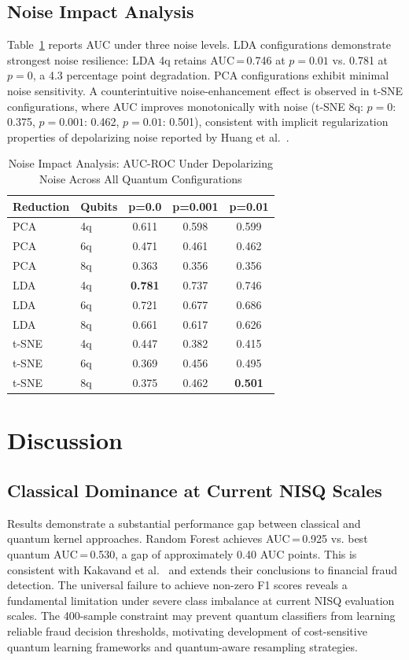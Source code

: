 \documentclass[journal]{IEEEtran}
\begin{document}
\subsection{Noise Impact Analysis}
Table~\ref{tab:noise_results} reports AUC under three noise 
levels. LDA configurations demonstrate strongest noise 
resilience: LDA 4q retains AUC\,=\,0.746 at $p=0.01$ vs. 
0.781 at $p=0$, a 4.3 percentage point degradation. 
PCA configurations exhibit minimal noise sensitivity. 
A counterintuitive noise-enhancement effect is observed in 
t-SNE configurations, where AUC improves monotonically with 
noise (t-SNE 8q: $p=0$: 0.375, $p=0.001$: 0.462, $p=0.01$: 
0.501), consistent with implicit regularization properties 
of depolarizing noise reported by Huang et al.~\cite{huang2026}.

\begin{table}[h]
\caption{Noise Impact Analysis: AUC-ROC Under Depolarizing 
Noise Across All Quantum Configurations}
\label{tab:noise_results}
\centering
\begin{tabular}{llccc}
\toprule
\textbf{Reduction} & \textbf{Qubits} & \textbf{p=0.0} & 
\textbf{p=0.001} & \textbf{p=0.01} \\
\midrule
PCA   & 4q & 0.611 & 0.598 & 0.599 \\
PCA   & 6q & 0.471 & 0.461 & 0.462 \\
PCA   & 8q & 0.363 & 0.356 & 0.356 \\
LDA   & 4q & \textbf{0.781} & 0.737 & 0.746 \\
LDA   & 6q & 0.721 & 0.677 & 0.686 \\
LDA   & 8q & 0.661 & 0.617 & 0.626 \\
t-SNE & 4q & 0.447 & 0.382 & 0.415 \\
t-SNE & 6q & 0.369 & 0.456 & 0.495 \\
t-SNE & 8q & 0.375 & 0.462 & \textbf{0.501} \\
\bottomrule
\end{tabular}
\end{table}

\section{Discussion}
\label{sec:discussion}

\subsection{Classical Dominance at Current NISQ Scales}
Results demonstrate a substantial performance gap between 
classical and quantum kernel approaches. Random Forest 
achieves AUC\,=\,0.925 vs. best quantum AUC\,=\,0.530, 
a gap of approximately 0.40 AUC points. This is consistent 
with Kakavand et al.~\cite{kakavand2026} and extends their 
conclusions to financial fraud detection. The universal 
failure to achieve non-zero F1 scores reveals a fundamental 
limitation under severe class imbalance at current NISQ 
evaluation scales. The 400-sample constraint may prevent 
quantum classifiers from learning reliable fraud decision 
thresholds, motivating development of cost-sensitive quantum 
learning frameworks and quantum-aware resampling strategies.
\end{document}
